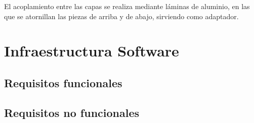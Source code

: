 El acoplamiento entre las capas se realiza mediante láminas de aluminio, en las que se atornillan las piezas de arriba y de abajo, sirviendo como adaptador.


\section{Infraestructura Software}
\label{sec:infra_software}

\subsection{Requisitos funcionales}

\subsection{Requisitos no funcionales}
